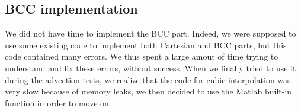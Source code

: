 \documentclass[accepted,single]{gipaper}
\begin{document}










\subsection{BCC implementation}
We did not have time to implement the BCC part. Indeed, we were supposed to use some existing code to implement both Cartesian and BCC parts, but this code contained many errors. We thus spent a large amout of time trying to understand and fix these errors, without success. When we finally tried to use it during the advection tests, we realize that the code for cubic interpolation was very slow because of memory leaks, we then decided to use the Matlab built-in function in order to move on.
\end{document}
